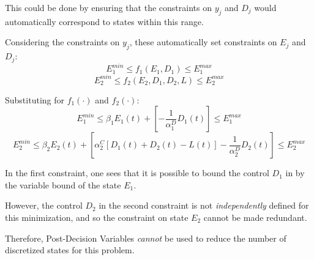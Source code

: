 \documentclass{article}
\begin{document}
	This could be done by ensuring that the constraints on $y_{j}$ and $D_{j}$ would automatically correspond to states within this range.
	
	Considering the constraints on $y_{j}$, these automatically set constraints on $E_{j}$ and $D_{j}$:
	\begin{displaymath}E_{1}^{min}\leq f_{1}(E_{1},D_{1})\leq E_{1}^{max}\end{displaymath}
	\begin{displaymath}E_{2}^{min}\leq f_{2}(E_{2},D_{1},D_{2},L)\leq E_{2}^{max}\end{displaymath}
	
	Substituting for $f_{1}(\cdot)$ and $f_{2}(\cdot)$:
	\begin{displaymath}E_{1}^{min}\leq \beta_{1}E_{1}(t)+\left[-\frac{1}{\alpha_{1}^{D}}D_{1}(t)\right]\leq E_{1}^{max}\end{displaymath}
	\begin{displaymath}E_{2}^{min}\leq \beta_{2}E_{2}(t)+\left[\alpha_{2}^{C}[D_{1}(t)+D_{2}(t)-L(t)]-\frac{1}{\alpha_{2}^{D}}D_{2}(t)\right]\leq E_{2}^{max}\end{displaymath}
	
	In the first constraint, one sees that it is possible to bound the control $D_{1}$ in by the variable bound of the state $E_{1}$.
	
	However, the control $D_{2}$ in the second constraint is not \textit{independently} defined for this minimization, and so the constraint on state $E_{2}$ cannot be made redundant.
	
	Therefore, Post-Decision Variables \textit{cannot} be used to reduce the number of discretized states for this problem.
	
	
	
\end{document}
